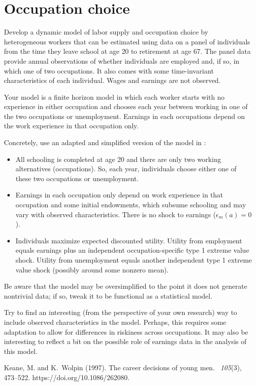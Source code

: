 \documentclass[fleqn,12pt]{article}
\renewenvironment{thebibliography}[1]{\begin{oldthebibliography}{#1}\setlength{\itemsep}{4.2pt}}{\end{oldthebibliography}}
\theoremstyle{plain}
\theoremstyle{definition}
\begin{document}
\section*{Occupation choice}

Develop a dynamic model of labor supply and occupation choice by heterogeneous workers that can be estimated using data on a panel of individuals from the time they leave school at age 20 to retirement at age 67. The panel data provide annual observations of whether individuals are employed and, if so, in which one of two occupations. It also comes with some time-invariant characteristics of each individual. Wages and earnings are not observed. 

Your model is a finite horizon model in which each worker starts with no experience in either occupation and chooses each year between working in one of the two occupations or unemployment. Earnings in each occupations depend on the work experience in that occupation only. 

Concretely, use an adapted and simplified version of the model in \citet[][Section I]{doi:10.1086/262080}:
\begin{itemize}
\item All schooling is completed at age 20 and there are only two working alternatives (occupations). So, each year, individuals choose either one of these two occupations or unemployment.
\item Earnings in each occupation only depend on work experience in that occupation and some initial endowments, which subsume schooling and may vary with observed characteristics. There is no shock to earnings ($\epsilon_m(a)=0$).
\item Individuals maximize expected discounted utility. Utility from employment equals earnings plus an independent occupation-specific type 1 extreme value shock. Utility from unemployment equals another independent type 1 extreme value shock (possibly around some nonzero mean).
\end{itemize}
Be aware that the model may be oversimplified to the point it does not generate nontrivial data; if so, tweak it to be functional as a statistical model. 

Try to find an interesting (from the perspective of your own research) way to include observed characteristics in the model. Perhaps, this requires some adaptation to allow for differences in riskiness across occupations. It may also be interesting to reflect a bit on the possible role of earnings data in the analysis of this model.

\begin{thebibliography}{}

Keane, M. and K.~Wolpin (1997).
\newblock The career decisions of young men.
~{\em 105\/}(3), 473--522.
\newblock https://doi.org/10.1086/262080.

\end{thebibliography}
\end{document}
